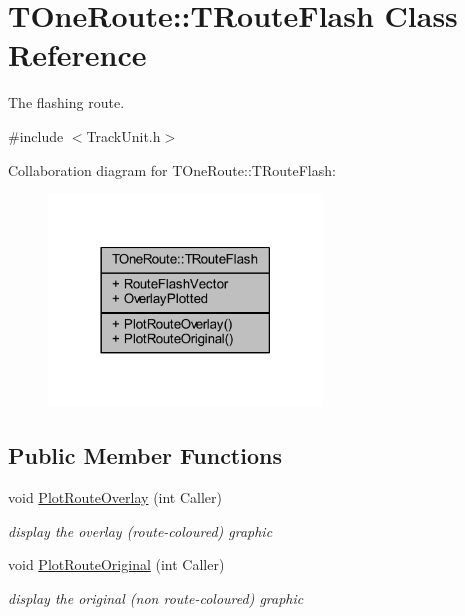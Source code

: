 \hypertarget{class_t_one_route_1_1_t_route_flash}{}\section{T\+One\+Route\+:\+:T\+Route\+Flash Class Reference}
\label{class_t_one_route_1_1_t_route_flash}


The flashing route.  




{\ttfamily \#include $<$Track\+Unit.\+h$>$}



Collaboration diagram for T\+One\+Route\+:\+:T\+Route\+Flash\+:\nopagebreak
\begin{figure}[H]
\begin{center}
\leavevmode
\includegraphics[width=206pt]{class_t_one_route_1_1_t_route_flash__coll__graph}
\end{center}
\end{figure}
\subsection*{Public Member Functions}
\begin{DoxyCompactItemize}
\item 
\mbox{\label{class_t_one_route_1_1_t_route_flash_a0292e6d0f38d48da408bb85a60f17944}} 
void \mbox{\hyperlink{class_t_one_route_1_1_t_route_flash_a0292e6d0f38d48da408bb85a60f17944}{Plot\+Route\+Overlay}} (int Caller)
\begin{DoxyCompactList}\small\item\em display the overlay (route-\/coloured) graphic \end{DoxyCompactList}\item 
\mbox{\label{class_t_one_route_1_1_t_route_flash_a08346a8f10834cc575c175238c7e84ae}} 
void \mbox{\hyperlink{class_t_one_route_1_1_t_route_flash_a08346a8f10834cc575c175238c7e84ae}{Plot\+Route\+Original}} (int Caller)
\begin{DoxyCompactList}\small\item\em display the original (non route-\/coloured) graphic \end{DoxyCompactList}\end{DoxyCompactItemize}

